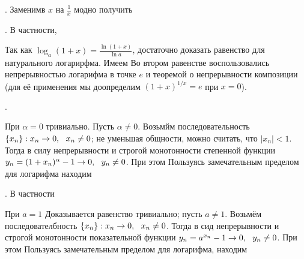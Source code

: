 . Заменимв $x$ на $\frac 1x$ модно получить 

.  В частности, 

\D Так как $\log_a(1 + x) = \frac{\ln(1 + x)}{\ln a}$, достаточно доказать равенство для натурального логарирфма. Имеем  Во втором равенстве воспользовались непрерывностью логарифма в точке $e$ и теоремой о непрерывности композиции (для её применения мы доопределим $(1 + x)^{1/x} = e$ при $x = 0$).

. 

\D При $\alpha = 0$ тривиально. Пусть $\alpha \neq 0$. Возьмйм последовательность $\{x_n\}: x_n \to 0,\ \  x_n \neq 0$; не уменьшая общности, можно считать, что $|x_n| < 1$. Тогда в силу непрерывности и строгой монотонности степенной функции $y_n = (1 + x_n)^\alpha - 1 \to 0,\ \  y_n \neq 0$. При этом  Пользуясь замечательным пределом для логарифма находим

.  В частности 

\D При $a = 1$ Доказывается равенство тривиально; пусть $a \neq 1$. Возьмём последователбность $\{x_n\}:x_n\to 0,\ \  x_n \neq 0$. Тогда в сид непрерывности и строгой монотонности показательной функции $y_n = a^{x_n} - 1 \to 0,\ \  y_n \neq 0$. При этом  Пользуясь замечательным пределом для логарифма, находим 